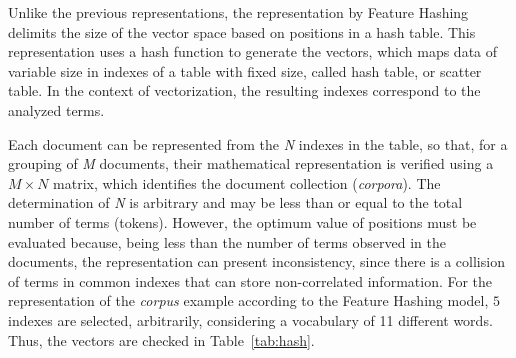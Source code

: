 \documentclass{ieeeaccess}
\begin{document}
Unlike the previous representations, the representation by Feature Hashing delimits the size of the vector space based on positions in a hash table. This representation uses a hash function  to generate the vectors, which maps data of variable size in indexes of a table with fixed size, called  hash table, or scatter table. In the context of vectorization, the resulting indexes correspond to the analyzed terms.

%

Each document can be represented from the \textsl{N} indexes in the table, so that, for a grouping of \textsl{M} documents, their mathematical representation is verified using a $M \times N $ matrix, which identifies the document collection (\textit{corpora}). The determination of \textsl{N} is arbitrary and may be less than or equal to the total number of terms (tokens). However, the optimum value of positions must be evaluated because, being less than the number of terms observed in the documents, the representation can present inconsistency, since there is a collision of terms in common indexes that can store non-correlated information.
%
%
For the representation of the \textit{corpus} example according to the Feature Hashing model, $5$ indexes are selected, arbitrarily, considering a vocabulary of 11 different words. Thus, the vectors are checked in Table~\ref{tab:hash}.


\end{document}
